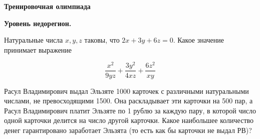 \centerline{\bf \Huge Тренировочная олимпиада}
\centerline{\bf \Huge Уровень недорегион.}

\begin{flushright}
        \scriptsize{}
\end{flushright}

Натуральные числа $x, y, z$ таковы, что $2x + 3y + 6z = 0$. Какое значение принимает выражение

\[\dfrac{x^2}{9yz} + \dfrac{3y^2}{4xz} + \dfrac{6z^2}{xy}\]







Расул Владимирович выдал Эльзяте 1000 карточек с различными натуральными числами, не превосходящими 1500. Она раскладывает эти карточки на 500 пар, а Расул Владимирович платит Эльзяте по 1 рублю за каждую пару, в которой число одной карточки делится на число другой карточки. Какое наибольшее количество денег гарантировано заработает Эльзята (то есть как бы карточки не выдал РВ)?

